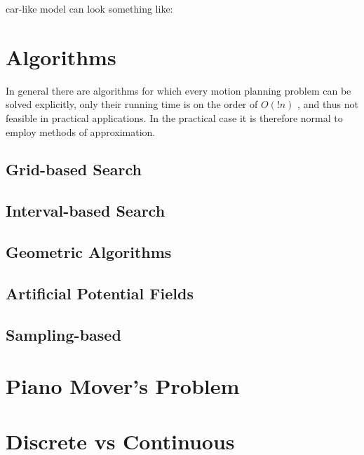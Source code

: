 car-like model can look something like:

\section{Algorithms}
In general there are algorithms for which every motion planning problem can be
solved explicitly, only their running time is on the order of \(O(!n)\) , and thus
not feasible in practical applications. In the practical case it is therefore
normal to employ methods of approximation.

\subsection{Grid-based Search}
\label{subsec:gridbasedsearch}

\subsection{Interval-based Search}
\label{subsec:intervalbasedsearch}

\subsection{Geometric Algorithms}
\label{subsec:geometricalgorithms}

\subsection{Artificial Potential Fields}
\label{subsec:artificialpotentialfields}

\subsection{Sampling-based}
\label{subsec:samplingbased}









\section{Piano Mover's Problem}

\section{Discrete vs Continuous}

